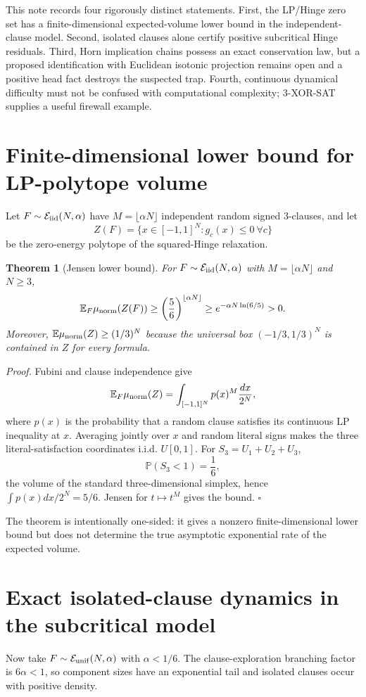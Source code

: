 \documentclass[11pt,a4paper]{article}
\newtheorem{theorem}{Theorem}[section]
\begin{document}
This note records four rigorously distinct statements. First, the LP/Hinge zero set has a finite-dimensional expected-volume lower bound in the independent-clause model. Second, isolated clauses alone certify positive subcritical Hinge residuals. Third, Horn implication chains possess an exact conservation law, but a proposed identification with Euclidean isotonic projection remains open and a positive head fact destroys the suspected trap. Fourth, continuous dynamical difficulty must not be confused with computational complexity; 3-XOR-SAT supplies a useful firewall example.

\section{Finite-dimensional lower bound for LP-polytope volume}
Let $F\sim\mathcal E_{\rm iid}(N,\alpha)$ have $M=\lfloor\alpha N\rfloor$ independent random signed 3-clauses, and let
\[
Z(F)=\{x\in[-1,1]^N:g_c(x)\le0\ \forall c\}
\]
be the zero-energy polytope of the squared-Hinge relaxation.

\begin{theorem}[Jensen lower bound]
For $F\sim\mathcal E_{\rm iid}(N,\alpha)$ with $M=\lfloor\alpha N\rfloor$ and $N\ge3$,
\[
\mathbb E_F\mu_{\rm norm}(Z(F))\ge\left(\frac56\right)^{\lfloor\alpha N\rfloor}\ge e^{-\alpha N\ln(6/5)}>0.
\]
Moreover, $\mathbb E\mu_{\rm norm}(Z)\ge(1/3)^N$ because the universal box $(-1/3,1/3)^N$ is contained in $Z$ for every formula.
\end{theorem}

\noindent\textit{Proof.} Fubini and clause independence give
\[
\mathbb E_F\mu_{\rm norm}(Z)=\int_{[-1,1]^N}p(x)^M\frac{dx}{2^N},
\]
where $p(x)$ is the probability that a random clause satisfies its continuous LP inequality at $x$. Averaging jointly over $x$ and random literal signs makes the three literal-satisfaction coordinates i.i.d. $U[0,1]$. For $S_3=U_1+U_2+U_3$,
\[
\mathbb P(S_3<1)=\frac16,
\]
the volume of the standard three-dimensional simplex, hence $\int p(x)dx/2^N=5/6$. Jensen for $t\mapsto t^M$ gives the bound. \hfill$\square$

The theorem is intentionally one-sided: it gives a nonzero finite-dimensional lower bound but does not determine the true asymptotic exponential rate of the expected volume.

\section{Exact isolated-clause dynamics in the subcritical model}
Now take $F\sim\mathcal E_{\rm unif}(N,\alpha)$ with $\alpha<1/6$. The clause-exploration branching factor is $6\alpha<1$, so component sizes have an exponential tail and isolated clauses occur with positive density.
\end{document}
